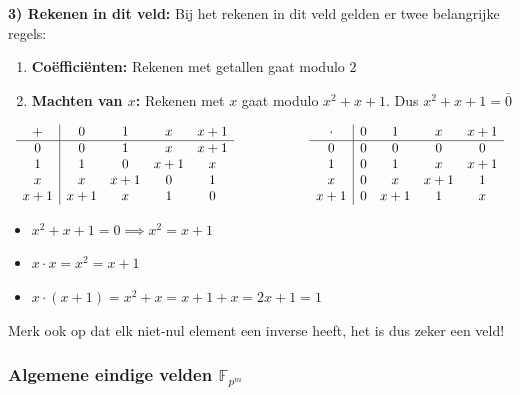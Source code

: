 \textbf{3) Rekenen in dit veld:} Bij het rekenen in dit veld gelden er twee belangrijke regels:
\begin{enumerate}
    \item \textbf{Coëfficiënten:} Rekenen met getallen gaat modulo $2$
    \item \textbf{Machten van $x$:} Rekenen met $x$ gaat modulo $x^2 + x + 1$. Dus $x^2 + x + 1 = \bar{0}$
\end{enumerate}

\begin{equation*}
\begin{array}{c@{\hspace{2cm}}c}
    \begin{array}{c|cccc}
        + & 0 & 1 & x & x+1 \\
        \hline
        0     & 0   & 1   & x   & x+1 \\
        1     & 1   & 0   & x+1 & x \\
        x     & x   & x+1 & 0   & 1 \\
        x+1   & x+1 & x   & 1   & 0
    \end{array}
    &
    \begin{array}{c|cccc}
        \cdot & 0 & 1 & x & x+1 \\
        \hline
        0     & 0 & 0   & 0   & 0 \\
        1     & 0 & 1   & x   & x+1 \\
        x     & 0 & x   & x+1 & 1 \\
        x+1   & 0 & x+1 & 1   & x
    \end{array}
\end{array}
\end{equation*}

\begin{itemize}
    \item $x^2 + x + 1 = 0 \implies x^2 = x + 1$
    \item $x \cdot x = x^2 = x + 1$
    \item $x \cdot (x + 1) = x^2 + x = x + 1 + x = 2x + 1 = 1$
\end{itemize}

Merk ook op dat elk niet-nul element een inverse heeft, het is dus zeker een veld!

\subsubsection{Algemene eindige velden \texorpdfstring{$\mathbb{F}_{p^m}$}{Fpm}}

